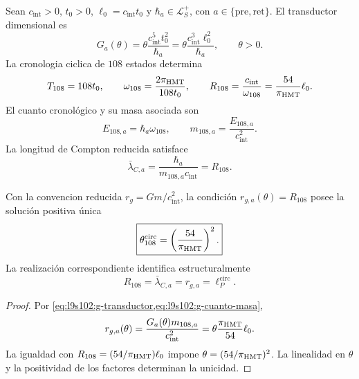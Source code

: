 Sean \(c_{\mathrm{int}}>0\), \(t_0>0\),
\(\ell_0=c_{\mathrm{int}}t_0\) y
\(\hbar_a\in\mathcal L_S^+\), con
\(a\in\{\mathrm{pre},\mathrm{ret}\}\). El transductor dimensional es
\begin{equation}
 G_a(\theta)
 =\theta\frac{c_{\mathrm{int}}^5t_0^2}{\hbar_a}
 =\theta\frac{c_{\mathrm{int}}^3\ell_0^2}{\hbar_a},
 \qquad \theta>0.
 \label{eq:l9s102:g-transductor}
\end{equation}
La cronologia ciclica de \(108\) estados determina
\begin{equation}
 T_{108}=108t_0,
 \qquad
 \omega_{108}=\frac{2\pi_{\rm HMT}}{108t_0},
 \qquad
 R_{108}=\frac{c_{\mathrm{int}}}{\omega_{108}}
 =\frac{54}{\pi_{\rm HMT}}\ell_0.
 \label{eq:l9s102:g-reloj108}
\end{equation}
El cuanto cronológico y su masa asociada son
\begin{equation}
 E_{108,a}=\hbar_a\omega_{108},
 \qquad
 m_{108,a}=\frac{E_{108,a}}{c_{\mathrm{int}}^2}.
 \label{eq:l9s102:g-cuanto-masa}
\end{equation}
La longitud de Compton reducida satisface
\begin{equation}
 \bar\lambda_{C,a}
 =\frac{\hbar_a}{m_{108,a}c_{\mathrm{int}}}=R_{108}.
 \label{eq:l9s102:g-compton}
\end{equation}

\begin{theorem}
\label{thm:l9s102:g-selector}
Con la convencion reducida \(r_g=Gm/c_{\mathrm{int}}^2\), la condición
\(r_{g,a}(\theta)=R_{108}\) posee la solución positiva única
\begin{equation}
 \boxed{
 \theta_{108}^{\mathrm{circ}}=\left(\frac{54}{\pi_{\rm HMT}}\right)^2.}
 \label{eq:l9s102:g-theta}
\end{equation}
La realización correspondiente identifica estructuralmente
\begin{equation}
 R_{108}=\bar\lambda_{C,a}=r_{g,a}=\ell_P^{\mathrm{circ}}.
 \label{eq:l9s102:g-cuatro-longitudes}
\end{equation}
\end{theorem}

\begin{proof}
Por \cref{eq:l9s102:g-transductor,eq:l9s102:g-cuanto-masa},
\[
 r_{g,a}(\theta)
 =\frac{G_a(\theta)m_{108,a}}{c_{\mathrm{int}}^2}
 =\theta\frac{\pi_{\rm HMT}}{54}\ell_0.
\]
La igualdad con \(R_{108}=(54/\pi_{\rm HMT})\ell_0\) impone
\(\theta=(54/\pi_{\rm HMT})^2\). La linealidad en \(\theta\) y la positividad de
los factores determinan la unicidad.
\end{proof}

